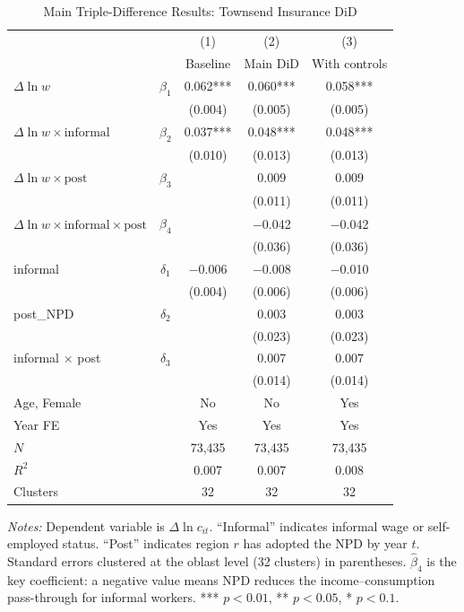 \documentclass[12pt]{article}
\begin{document}
\begin{table}[htbp]
\centering
\caption{Main Triple-Difference Results: Townsend Insurance DiD}
\label{tab:did_main}
\small
\begin{tabular}{lcccc}
\toprule
 & & (1) & (2) & (3) \\
 & & Baseline & Main DiD & With controls \\
\midrule
$\Delta \ln w$ & $\hat{\beta}_1$ & 0.062*** & 0.060*** & 0.058*** \\
 & & (0.004) & (0.005) & (0.005) \\[4pt]
$\Delta \ln w \times \text{informal}$ & $\hat{\beta}_2$ & 0.037*** & 0.048*** & 0.048*** \\
 & & (0.010) & (0.013) & (0.013) \\[4pt]
$\Delta \ln w \times \text{post}$ & $\hat{\beta}_3$ & & 0.009 & 0.009 \\
 & & & (0.011) & (0.011) \\[4pt]
$\Delta \ln w \times \text{informal} \times \text{post}$ & $\hat{\beta}_4$ & & $-$0.042 & $-$0.042 \\
 & & & (0.036) & (0.036) \\[4pt]
informal & $\hat{\delta}_1$ & $-$0.006 & $-$0.008 & $-$0.010 \\
 & & (0.004) & (0.006) & (0.006) \\[4pt]
post\_NPD & $\hat{\delta}_2$ & & 0.003 & 0.003 \\
 & & & (0.023) & (0.023) \\[4pt]
informal $\times$ post & $\hat{\delta}_3$ & & 0.007 & 0.007 \\
 & & & (0.014) & (0.014) \\
\midrule
Age, Female & & No & No & Yes \\
Year FE & & Yes & Yes & Yes \\
$N$ & & 73,435 & 73,435 & 73,435 \\
$R^2$ & & 0.007 & 0.007 & 0.008 \\
Clusters & & 32 & 32 & 32 \\
\bottomrule
\end{tabular}
\begin{minipage}{0.9\textwidth}
\vspace{0.3em}
\footnotesize \textit{Notes:} Dependent variable is $\Delta \ln c_{it}$. ``Informal'' indicates informal wage or self-employed status. ``Post'' indicates region $r$ has adopted the NPD by year $t$. Standard errors clustered at the oblast level (32 clusters) in parentheses. $\hat{\beta}_4$ is the key coefficient: a negative value means NPD reduces the income--consumption pass-through for informal workers. *** $p < 0.01$, ** $p < 0.05$, * $p < 0.1$.
\end{minipage}
\end{table}
\end{document}
